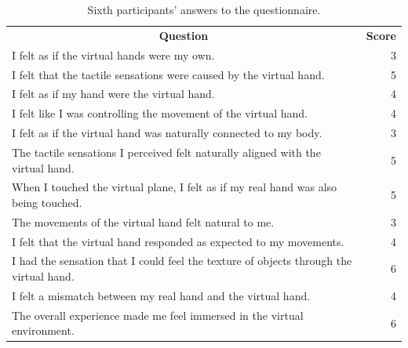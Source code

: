 \documentclass[uplatex,
12pt, %
a4paper,
english, %
oneside,
titlepage,
singlespacing, %
liststotoc, %
headsepline,
]{MastersDoctoralThesis} %
\begin{document}
\begin{appendices}
\begin{table}[H]
  \centering
  \caption{Sixth participants' answers to the questionnaire.}
    \begin{tabular}{|lrrrrrrrr|r|}
    \toprule
    \multicolumn{9}{c|}{\multirow{2}[2]{*}{\textbf{Question}}}            & \multicolumn{1}{c|}{\multirow{2}[2]{*}{\textbf{Score}}} \\
    \multicolumn{9}{c|}{}                                                 &  \\
    \midrule
    \multicolumn{9}{|l|}{I felt as if the virtual hands were my own.}     & 3 \\
    \midrule
    \multicolumn{9}{|l|}{I felt that the tactile sensations were caused by the virtual hand.} & 5 \\
    \midrule
    \multicolumn{9}{|l|}{I felt as if my hand were the virtual hand.}     & 4 \\
    \midrule
    \multicolumn{9}{|l|}{I felt like I was controlling the movement of the virtual hand.} & 4 \\
    \midrule
    \multicolumn{9}{|l|}{I felt as if the virtual hand was naturally connected to my body.} & 3 \\
    \midrule
    \multicolumn{9}{|l|}{The tactile sensations I perceived felt naturally aligned with the virtual hand.} & 5 \\
    \midrule
    \multicolumn{9}{|l|}{When I touched the virtual plane, I felt as if my real hand was also being touched.} & 5 \\
    \midrule
    \multicolumn{9}{|l|}{The movements of the virtual hand felt natural to me.} & 3 \\
    \midrule
    \multicolumn{9}{|l|}{I felt that the virtual hand responded as expected to my movements.} & 4 \\
    \midrule
    \multicolumn{9}{|l|}{I had the sensation that I could feel the texture of objects through the virtual hand.} & 6 \\
    \midrule
    \multicolumn{9}{|l|}{I felt a mismatch between my real hand and the virtual hand. } & 4 \\
    \midrule
    \multicolumn{9}{|l|}{The overall experience made me feel immersed in the virtual environment.} & 6 \\
    \bottomrule
    \end{tabular}%
  \label{tab:Q_6}%
\end{table}%



\end{appendices}
\end{document}
